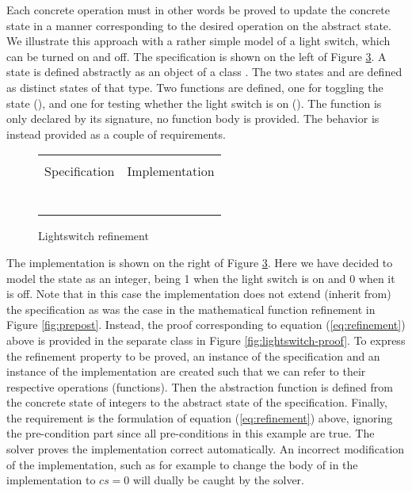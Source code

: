 \noindent
Each concrete operation must in other words be proved to update the concrete state
in a manner corresponding to the desired operation on the abstract state.
We illustrate this approach with a rather simple \Klang{} model of a light switch,
which can be turned on and off.  The specification is shown on the left of
Figure \ref{fig:lightswitch}. A state is defined abstractly as an object of 
a class . The two states  and  are defined as 
distinct states of that type. Two functions are defined, one for toggling
the state (), and one for testing whether the light switch is on
(). The  function is only declared by its signature, no 
function body is provided. The behavior is instead provided  as a couple of
requirements.

\begin{figure}
  \centering
  \begin{tabular}[c]{c|c}
    \hline \\
    Specification & Implementation \\
    \hline\hline \\ \\
    \begin{subfigure}[c]{0.5\textwidth}
     
      \label{fig:lightswitch1}
    \end{subfigure}
    &
    \begin{subfigure}[c]{0.5\textwidth}
      
      \label{fig:lightswicth2}
    \end{subfigure}
    \\ \\
    \hline
  \end{tabular}    
  \caption{Lightswitch refinement}
  \label{fig:lightswitch}
\end{figure}

The implementation is shown on the right of Figure \ref{fig:lightswitch}.
Here we have decided to model the state as an integer, being 1 when the light 
switch is on and 0 when it is off. Note that in this case the implementation
does not extend (inherit from) the specification as was the case in the 
mathematical function refinement in Figure \ref{fig:prepost}. Instead, the
proof corresponding to equation (\ref{eq:refinement}) above is provided
in the separate class  in Figure \ref{fig:lightswitch-proof}.
To express the refinement property to be proved, an instance  of the
specification and an instance  of the implementation are created such that we can refer to their respective operations (functions). Then the abstraction function  is defined from the concrete state of integers to the abstract state 
of the specification. Finally, the requirement is the \Klang{} formulation of 
equation (\ref{eq:refinement}) above, ignoring the pre-condition part since all
pre-conditions in this example are true. The \Klang{} solver proves the
implementation correct automatically. An incorrect modification of the implementation, such as for example to change the body of  in 
the implementation to $cs = 0$ will dually be caught by the solver.


